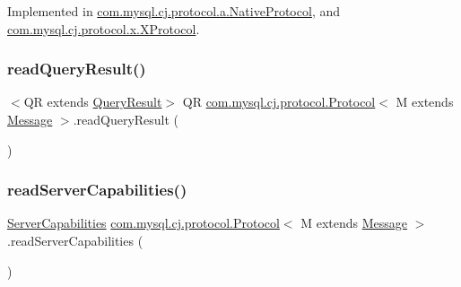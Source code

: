 Implemented in \mbox{\hyperlink{classcom_1_1mysql_1_1cj_1_1protocol_1_1a_1_1_native_protocol_ade969eccfe66d5a42008c60897d118d7}{com.\+mysql.\+cj.\+protocol.\+a.\+Native\+Protocol}}, and \mbox{\hyperlink{classcom_1_1mysql_1_1cj_1_1protocol_1_1x_1_1_x_protocol_a99e20fc57fa97bd0a490d9cfe725e2fa}{com.\+mysql.\+cj.\+protocol.\+x.\+X\+Protocol}}.

\mbox{\label{interfacecom_1_1mysql_1_1cj_1_1protocol_1_1_protocol_a4c6224539df13885a570b5865377ef01}} 
\subsubsection{\texorpdfstring{read\+Query\+Result()}{readQueryResult()}}
{\footnotesize\ttfamily $<$QR extends \mbox{\hyperlink{interfacecom_1_1mysql_1_1cj_1_1_query_result}{Query\+Result}}$>$ QR \mbox{\hyperlink{interfacecom_1_1mysql_1_1cj_1_1protocol_1_1_protocol}{com.\+mysql.\+cj.\+protocol.\+Protocol}}$<$ M extends \mbox{\hyperlink{interfacecom_1_1mysql_1_1cj_1_1protocol_1_1_message}{Message}} $>$.read\+Query\+Result (\begin{DoxyParamCaption}{ }\end{DoxyParamCaption})}

\mbox{\label{interfacecom_1_1mysql_1_1cj_1_1protocol_1_1_protocol_ac7608c87247ae3467a9f1e3e8c254042}} 
\subsubsection{\texorpdfstring{read\+Server\+Capabilities()}{readServerCapabilities()}}
{\footnotesize\ttfamily \mbox{\hyperlink{interfacecom_1_1mysql_1_1cj_1_1protocol_1_1_server_capabilities}{Server\+Capabilities}} \mbox{\hyperlink{interfacecom_1_1mysql_1_1cj_1_1protocol_1_1_protocol}{com.\+mysql.\+cj.\+protocol.\+Protocol}}$<$ M extends \mbox{\hyperlink{interfacecom_1_1mysql_1_1cj_1_1protocol_1_1_message}{Message}} $>$.read\+Server\+Capabilities (\begin{DoxyParamCaption}{ }\end{DoxyParamCaption})}

